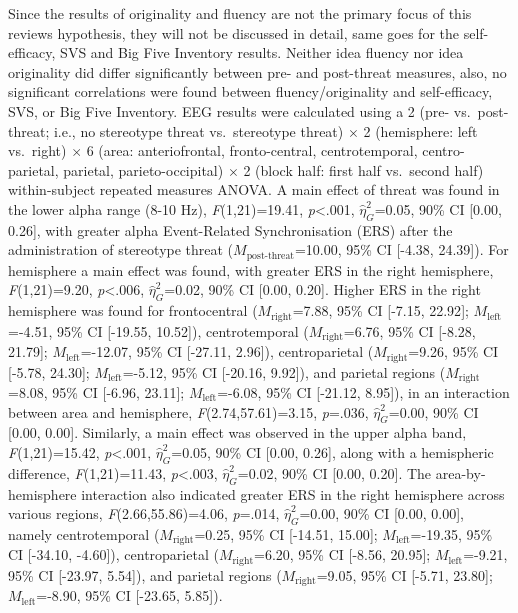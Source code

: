 \documentclass[
  stu,floatsintext]{apa7}
\begin{document}
Since the results of originality and fluency are not the primary focus of this reviews hypothesis, they will not be discussed in detail, same goes for the self-efficacy, SVS and Big Five Inventory results.
Neither idea fluency nor idea originality did differ significantly between pre- and post-threat measures, also, no significant correlations were found between fluency/originality and self-efficacy, SVS, or Big Five Inventory.
EEG results were calculated using a 2 (pre- vs.~post-threat; i.e., no stereotype threat vs.~stereotype threat) \(\times\) 2 (hemisphere: left vs.~right) \(\times\) 6 (area: anteriofrontal, fronto-central, centrotemporal, centro-parietal, parietal, parieto-occipital) \(\times\) 2 (block half: first half vs.~second half) within-subject repeated measures ANOVA.
A main effect of threat was found in the lower alpha range (8-10 Hz), \emph{F}(1,21)=19.41, \emph{p}\textless.001, \(\hat{\eta}^{2}_{G}\)=0.05, 90\% CI {[}0.00, 0.26{]}, with greater alpha Event-Related Synchronisation (ERS) after the administration of stereotype threat (\(M_{\text{post-threat}}\)=10.00, 95\% CI {[}-4.38, 24.39{]}).
For hemisphere a main effect was found, with greater ERS in the right hemisphere, \emph{F}(1,21)=9.20, \emph{p}\textless.006, \(\hat{\eta}^{2}_{G}\)=0.02, 90\% CI {[}0.00, 0.20{]}.
Higher ERS in the right hemisphere was found for frontocentral (\(M_{\text{right}}\)=7.88, 95\% CI {[}-7.15, 22.92{]}; \(M_{\text{left}}\)=-4.51, 95\% CI {[}-19.55, 10.52{]}), centrotemporal (\(M_{\text{right}}\)=6.76, 95\% CI {[}-8.28, 21.79{]}; \(M_{\text{left}}\)=-12.07, 95\% CI {[}-27.11, 2.96{]}), centroparietal (\(M_{\text{right}}\)=9.26, 95\% CI {[}-5.78, 24.30{]}; \(M_{\text{left}}\)=-5.12, 95\% CI {[}-20.16, 9.92{]}), and parietal regions (\(M_{\text{right}}\)=8.08, 95\% CI {[}-6.96, 23.11{]}; \(M_{\text{left}}\)=-6.08, 95\% CI {[}-21.12, 8.95{]}), in an interaction between area and hemisphere, \emph{F}(2.74,57.61)=3.15, \emph{p}=.036, \(\hat{\eta}^{2}_{G}\)=0.00, 90\% CI {[}0.00, 0.00{]}.
Similarly, a main effect was observed in the upper alpha band, \emph{F}(1,21)=15.42, \emph{p}\textless.001, \(\hat{\eta}^{2}_{G}\)=0.05, 90\% CI {[}0.00, 0.26{]}, along with a hemispheric difference, \emph{F}(1,21)=11.43, \emph{p}\textless.003, \(\hat{\eta}^{2}_{G}\)=0.02, 90\% CI {[}0.00, 0.20{]}.
The area-by-hemisphere interaction also indicated greater ERS in the right hemisphere across various regions, \emph{F}(2.66,55.86)=4.06, \emph{p}=.014, \(\hat{\eta}^{2}_{G}\)=0.00, 90\% CI {[}0.00, 0.00{]}, namely centrotemporal (\(M_{\text{right}}\)=0.25, 95\% CI {[}-14.51, 15.00{]}; \(M_{\text{left}}\)=-19.35, 95\% CI {[}-34.10, -4.60{]}), centroparietal (\(M_{\text{right}}\)=6.20, 95\% CI {[}-8.56, 20.95{]}; \(M_{\text{left}}\)=-9.21, 95\% CI {[}-23.97, 5.54{]}), and parietal regions (\(M_{\text{right}}\)=9.05, 95\% CI {[}-5.71, 23.80{]}; \(M_{\text{left}}\)=-8.90, 95\% CI {[}-23.65, 5.85{]}).
\end{document}
